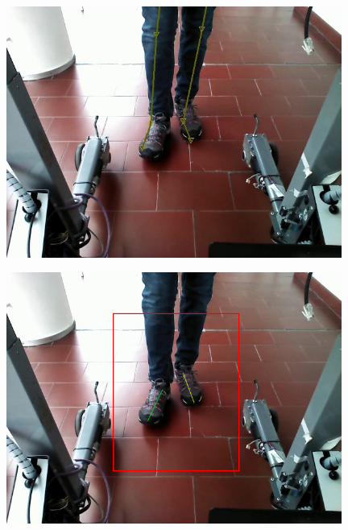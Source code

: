 \documentclass[a4paper]{report}
\begin{document}

\begin{figure}[H]
\centering
\begin{minipage}{.5\textwidth}
  \centering
    \includegraphics[width=0.98\textwidth]{images/building/results/frameGT20.png}
\end{minipage}%
\begin{minipage}{.5\textwidth}
  \centering
    \includegraphics[width=0.98\textwidth]{images/building/results/frame20.png}
    \label{img:Frame20}
\end{minipage}%
\end{figure}
\end{document}
